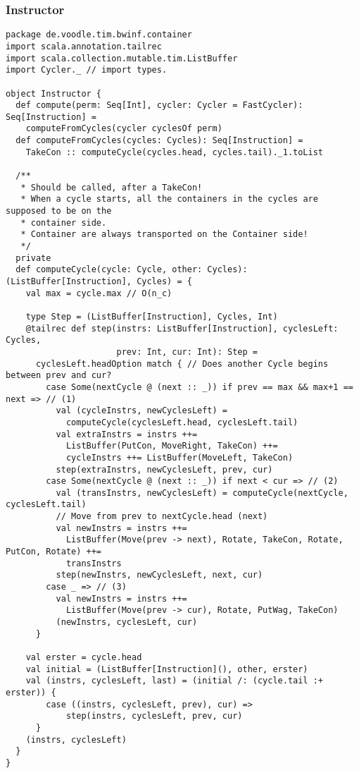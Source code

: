 \subsubsection{Instructor}
\begin{lstlisting}
package de.voodle.tim.bwinf.container
import scala.annotation.tailrec
import scala.collection.mutable.tim.ListBuffer
import Cycler._ // import types.

object Instructor {
  def compute(perm: Seq[Int], cycler: Cycler = FastCycler): Seq[Instruction] =
    computeFromCycles(cycler cyclesOf perm)
  def computeFromCycles(cycles: Cycles): Seq[Instruction] =
    TakeCon :: computeCycle(cycles.head, cycles.tail)._1.toList

  /**
   * Should be called, after a TakeCon!
   * When a cycle starts, all the containers in the cycles are supposed to be on the
   * container side.
   * Container are always transported on the Container side!
   */
  private
  def computeCycle(cycle: Cycle, other: Cycles): (ListBuffer[Instruction], Cycles) = {
    val max = cycle.max // O(n_c)

    type Step = (ListBuffer[Instruction], Cycles, Int)
    @tailrec def step(instrs: ListBuffer[Instruction], cyclesLeft: Cycles,
                      prev: Int, cur: Int): Step =
      cyclesLeft.headOption match { // Does another Cycle begins between prev and cur?
        case Some(nextCycle @ (next :: _)) if prev == max && max+1 == next => // (1)
          val (cycleInstrs, newCyclesLeft) =
            computeCycle(cyclesLeft.head, cyclesLeft.tail)
          val extraInstrs = instrs ++=
            ListBuffer(PutCon, MoveRight, TakeCon) ++=
            cycleInstrs ++= ListBuffer(MoveLeft, TakeCon)
          step(extraInstrs, newCyclesLeft, prev, cur)
        case Some(nextCycle @ (next :: _)) if next < cur => // (2)
          val (transInstrs, newCyclesLeft) = computeCycle(nextCycle, cyclesLeft.tail)
          // Move from prev to nextCycle.head (next)
          val newInstrs = instrs ++=
            ListBuffer(Move(prev -> next), Rotate, TakeCon, Rotate, PutCon, Rotate) ++=
            transInstrs
          step(newInstrs, newCyclesLeft, next, cur)
        case _ => // (3)
          val newInstrs = instrs ++=
            ListBuffer(Move(prev -> cur), Rotate, PutWag, TakeCon)
          (newInstrs, cyclesLeft, cur)
      }

    val erster = cycle.head
    val initial = (ListBuffer[Instruction](), other, erster)
    val (instrs, cyclesLeft, last) = (initial /: (cycle.tail :+ erster)) {
        case ((instrs, cyclesLeft, prev), cur) =>
            step(instrs, cyclesLeft, prev, cur)
      }
    (instrs, cyclesLeft)
  }
}
\end{lstlisting}
\newpage
